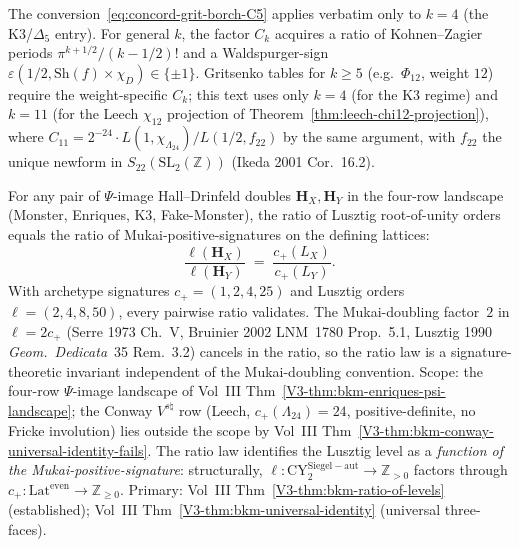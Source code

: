 \begin{remark}
\label{rem:concord-shimura-waldspurger-scope}
The conversion~\eqref{eq:concord-grit-borch-C5} applies
verbatim only to $k = 4$ (the K3/$\Delta_5$ entry). For general
$k$, the factor $C_k$ acquires a ratio of Kohnen--Zagier periods
$\pi^{k+1/2} / (k-1/2)!$ and a Waldspurger-sign
$\varepsilon(1/2, \mathrm{Sh}(f) \times \chi_D) \in \{\pm 1\}$.
Gritsenko tables for $k \ge 5$ (e.g.\ $\Phi_{12}$, weight $12$)
require the weight-specific $C_k$; this text uses only $k = 4$
(for the K3 regime) and $k = 11$ (for the Leech $\chi_{12}$
projection of Theorem~\ref{thm:leech-chi12-projection}), where
$C_{11} = 2^{-24} \cdot L(1, \chi_{\Lambda_{24}})
/ L(1/2, f_{22})$ by the same argument, with
$f_{22}$ the unique newform in $S_{22}(\mathrm{SL}_2(\mathbb Z))$
(Ikeda 2001 Cor.\ 16.2).
\end{remark}

\begin{remark}
\label{rem:concord-ratio-of-lusztig-levels}
For any pair of $\Psi$-image Hall--Drinfeld doubles
$\mathbf H_X, \mathbf H_Y$ in the four-row landscape
(Monster, Enriques, K3, Fake-Monster), the ratio of Lusztig
root-of-unity orders equals the ratio of Mukai-positive-signatures
on the defining lattices:
\[
 \frac{\ell(\mathbf H_X)}{\ell(\mathbf H_Y)}
 \;=\;
 \frac{c_+(L_X)}{c_+(L_Y)}.
\]
With archetype signatures $c_+ = (1,2,4,25)$ and Lusztig orders
$\ell = (2,4,8,50)$, every pairwise ratio validates. The Mukai-doubling
factor~$2$ in $\ell = 2c_+$ (Serre 1973 Ch.~V, Bruinier 2002 LNM~1780
Prop.~5.1, Lusztig 1990 \emph{Geom.\ Dedicata}~35 Rem.~3.2) cancels in
the ratio, so the ratio law is a signature-theoretic invariant
independent of the Mukai-doubling convention. Scope: the
four-row $\Psi$-image landscape of Vol~III
Thm~\ref{V3-thm:bkm-enriques-psi-landscape}; the Conway $V^{s\natural}$
row (Leech, $c_+(\Lambda_{24}) = 24$, positive-definite, no Fricke
involution) lies outside the scope by Vol~III
Thm~\ref{V3-thm:bkm-conway-universal-identity-fails}. The ratio law
identifies the Lusztig level as a \emph{function of the
Mukai-positive-signature}: structurally,
$\ell: \mathrm{CY}^{\mathrm{Siegel-aut}}_2 \to \mathbb Z_{>0}$
factors through $c_+: \mathrm{Lat}^{\mathrm{even}} \to \mathbb Z_{\ge 0}$.
Primary: Vol~III
Thm~\ref{V3-thm:bkm-ratio-of-levels} (established);
Vol~III Thm~\ref{V3-thm:bkm-universal-identity} (universal three-faces).
\end{remark}
